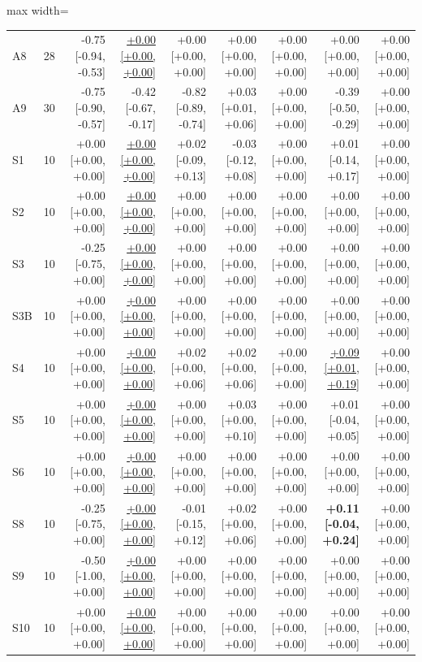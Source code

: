 \begin{table}[t]
\begin{adjustbox}{max width=\textwidth}
\begin{tabular}{@{}lrrrrrrrr@{}}
A8 & 28 & -0.75 [-0.94, -0.53] & \underline{+0.00 [+0.00, +0.00]} & +0.00 [+0.00, +0.00] & +0.00 [+0.00, +0.00] & +0.00 [+0.00, +0.00] & +0.00 [+0.00, +0.00] & +0.00 [+0.00, +0.00] \\
A9 & 30 & -0.75 [-0.90, -0.57] & -0.42 [-0.67, -0.17] & -0.82 [-0.89, -0.74] & +0.03 [+0.01, +0.06] & +0.00 [+0.00, +0.00] & -0.39 [-0.50, -0.29] & +0.00 [+0.00, +0.00] \\
S1 & 10 & +0.00 [+0.00, +0.00] & \underline{+0.00 [+0.00, +0.00]} & +0.02 [-0.09, +0.13] & -0.03 [-0.12, +0.08] & +0.00 [+0.00, +0.00] & +0.01 [-0.14, +0.17] & +0.00 [+0.00, +0.00] \\
S2 & 10 & +0.00 [+0.00, +0.00] & \underline{+0.00 [+0.00, +0.00]} & +0.00 [+0.00, +0.00] & +0.00 [+0.00, +0.00] & +0.00 [+0.00, +0.00] & +0.00 [+0.00, +0.00] & +0.00 [+0.00, +0.00] \\
S3 & 10 & -0.25 [-0.75, +0.00] & \underline{+0.00 [+0.00, +0.00]} & +0.00 [+0.00, +0.00] & +0.00 [+0.00, +0.00] & +0.00 [+0.00, +0.00] & +0.00 [+0.00, +0.00] & +0.00 [+0.00, +0.00] \\
S3B & 10 & +0.00 [+0.00, +0.00] & \underline{+0.00 [+0.00, +0.00]} & +0.00 [+0.00, +0.00] & +0.00 [+0.00, +0.00] & +0.00 [+0.00, +0.00] & +0.00 [+0.00, +0.00] & +0.00 [+0.00, +0.00] \\
S4 & 10 & +0.00 [+0.00, +0.00] & \underline{+0.00 [+0.00, +0.00]} & +0.02 [+0.00, +0.06] & +0.02 [+0.00, +0.06] & +0.00 [+0.00, +0.00] & \underline{+0.09 [+0.01, +0.19]} & +0.00 [+0.00, +0.00] \\
S5 & 10 & +0.00 [+0.00, +0.00] & \underline{+0.00 [+0.00, +0.00]} & +0.00 [+0.00, +0.00] & +0.03 [+0.00, +0.10] & +0.00 [+0.00, +0.00] & +0.01 [-0.04, +0.05] & +0.00 [+0.00, +0.00] \\
S6 & 10 & +0.00 [+0.00, +0.00] & \underline{+0.00 [+0.00, +0.00]} & +0.00 [+0.00, +0.00] & +0.00 [+0.00, +0.00] & +0.00 [+0.00, +0.00] & +0.00 [+0.00, +0.00] & +0.00 [+0.00, +0.00] \\
S8 & 10 & -0.25 [-0.75, +0.00] & \underline{+0.00 [+0.00, +0.00]} & -0.01 [-0.15, +0.12] & +0.02 [+0.00, +0.06] & +0.00 [+0.00, +0.00] & \textbf{+0.11 [-0.04, +0.24]} & +0.00 [+0.00, +0.00] \\
S9 & 10 & -0.50 [-1.00, +0.00] & \underline{+0.00 [+0.00, +0.00]} & +0.00 [+0.00, +0.00] & +0.00 [+0.00, +0.00] & +0.00 [+0.00, +0.00] & +0.00 [+0.00, +0.00] & +0.00 [+0.00, +0.00] \\
S10 & 10 & +0.00 [+0.00, +0.00] & \underline{+0.00 [+0.00, +0.00]} & +0.00 [+0.00, +0.00] & +0.00 [+0.00, +0.00] & +0.00 [+0.00, +0.00] & +0.00 [+0.00, +0.00] & +0.00 [+0.00, +0.00] \\

\end{tabular}
\end{adjustbox}
\end{table}
